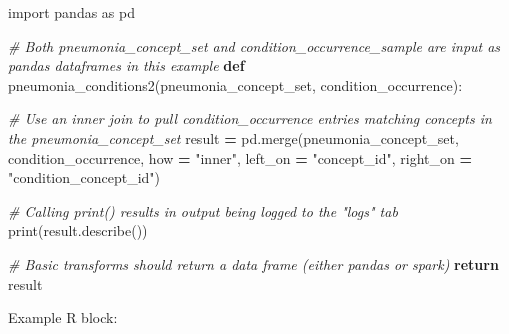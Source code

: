 \documentclass[
]{book}
\newenvironment{Shaded}{\begin{snugshade}}{\end{snugshade}}
\newcommand{\BuiltInTok}[1]{#1}
\newcommand{\CommentTok}[1]{\textcolor[rgb]{0.56,0.35,0.01}{\textit{#1}}}
\newcommand{\ControlFlowTok}[1]{\textcolor[rgb]{0.13,0.29,0.53}{\textbf{#1}}}
\newcommand{\ImportTok}[1]{#1}
\newcommand{\KeywordTok}[1]{\textcolor[rgb]{0.13,0.29,0.53}{\textbf{#1}}}
\newcommand{\NormalTok}[1]{#1}
\newcommand{\OperatorTok}[1]{\textcolor[rgb]{0.81,0.36,0.00}{\textbf{#1}}}
\newcommand{\StringTok}[1]{\textcolor[rgb]{0.31,0.60,0.02}{#1}}
\begin{document}
\begin{Shaded}
\begin{Highlighting}[]
\ImportTok{import}\NormalTok{ pandas }\ImportTok{as}\NormalTok{ pd}

\CommentTok{# Both pneumonia_concept_set and condition_occurrence_sample are input as pandas dataframes in this example}
\KeywordTok{def}\NormalTok{ pneumonia_conditions2(pneumonia_concept_set, condition_occurrence):}

    \CommentTok{# Use an inner join to pull condition_occurrence entries matching concepts in the pneumonia_concept_set}
\NormalTok{    result }\OperatorTok{=}\NormalTok{ pd.merge(pneumonia_concept_set, condition_occurrence, how }\OperatorTok{=} \StringTok{"inner"}\NormalTok{, left_on }\OperatorTok{=} \StringTok{"concept_id"}\NormalTok{, right_on }\OperatorTok{=} \StringTok{"condition_concept_id"}\NormalTok{)}
    
    \CommentTok{# Calling print() results in output being logged to the "logs" tab}
    \BuiltInTok{print}\NormalTok{(result.describe())}

    \CommentTok{# Basic transforms should return a data frame (either pandas or spark)}
    \ControlFlowTok{return}\NormalTok{ result}
\end{Highlighting}
\end{Shaded}

Example R block:
\end{document}
